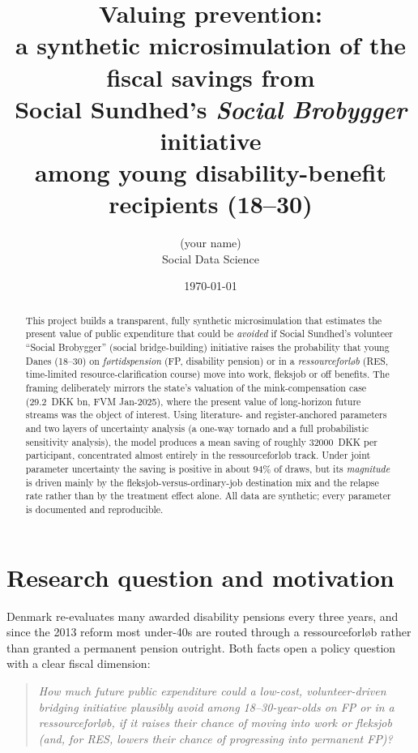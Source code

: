 \documentclass[11pt,a4paper]{article}
\title{\textbf{Valuing prevention:\\
a synthetic microsimulation of the fiscal savings from\\
Social Sundhed's \emph{Social Brobygger} initiative\\
among young disability-benefit recipients (18--30)}}
\author{(your name)\\[2pt]\small Social Data Science}
\date{\today}
\newcommand{\dkk}[1]{\SI{#1}{DKK}}
\begin{document}
\maketitle

\begin{abstract}
\noindent This project builds a transparent, fully synthetic microsimulation
that estimates the present value of public expenditure that could be
\emph{avoided} if Social Sundhed's volunteer ``Social Brobygger''
(social bridge-building) initiative raises the probability that young Danes
(18--30) on \emph{f\o rtidspension} (FP, disability pension) or in a
\emph{ressourceforl\o b} (RES, time-limited resource-clarification course) move
into work, fleksjob or off benefits. The framing deliberately mirrors the
state's valuation of the mink-compensation case (\dkk{29.2} bn, FVM Jan-2025),
where the present value of long-horizon future streams was the object of
interest. Using literature- and register-anchored parameters and two layers of
uncertainty analysis (a one-way tornado and a full probabilistic sensitivity
analysis), the model produces a mean saving of roughly \dkk{32000} per
participant, concentrated almost entirely in the ressourceforl\o b track. Under
joint parameter uncertainty the saving is positive in about $94\%$ of draws,
but its \emph{magnitude} is driven mainly by the fleksjob-versus-ordinary-job
destination mix and the relapse rate rather than by the treatment effect alone.
All data are synthetic; every parameter is documented and reproducible.
\end{abstract}

\tableofcontents
\bigskip

\section{Research question and motivation}
Denmark re-evaluates many awarded disability pensions every three years, and
since the 2013 reform most under-40s are routed through a ressourceforl\o b
rather than granted a permanent pension outright. Both facts open a policy
question with a clear fiscal dimension:

\begin{quote}
\itshape How much future public expenditure could a low-cost, volunteer-driven
bridging initiative plausibly avoid among 18--30-year-olds on FP or in a
ressourceforl\o b, if it raises their chance of moving into work or fleksjob
(and, for RES, lowers their chance of progressing into permanent FP)?
\end{quote}
\end{document}
